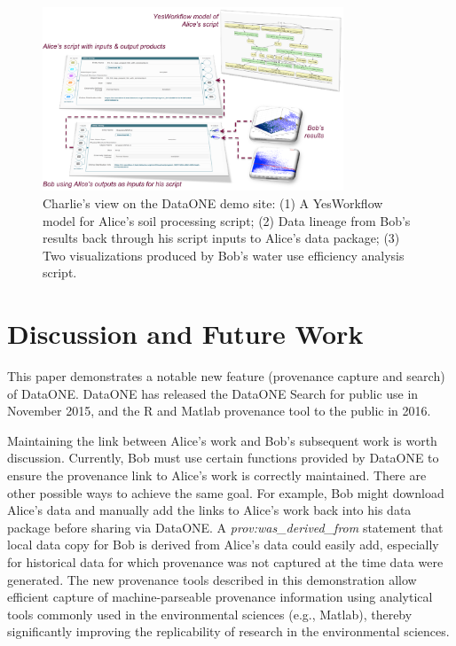 \documentclass[a4paper]{llncs}
\begin{document}
\begin{figure}[t]
\centering   
\includegraphics[width=0.8\textwidth]{figs/abc-crop}
\caption{Charlie's view on the DataONE demo site: (1) A YesWorkflow model for Alice's soil processing script; (2) Data lineage from Bob's results back through his script inputs to Alice's data package; (3) Two visualizations produced by Bob's water use efficiency analysis script.}
\label{fig2}
\end{figure}


\section{Discussion and Future Work}

This paper demonstrates a notable new feature (provenance capture and search) of DataONE. DataONE has released the DataONE Search for public use in November 2015, and the R and Matlab provenance tool to the public in 2016. 

Maintaining the link between Alice's work and Bob's subsequent work is worth discussion. Currently, Bob must use certain functions provided by DataONE to ensure the provenance link to Alice's work is correctly maintained. There are other possible ways to achieve the same goal. For example,  Bob might download Alice's data and manually add the links to Alice's work back into his data package before sharing via DataONE. A \emph{prov:was\_derived\_from} statement that local data copy for Bob is derived from Alice's data could easily add, especially for historical data for which provenance was not captured at the time data were generated.  The new provenance tools described in this demonstration allow efficient capture of machine-parseable provenance information using analytical tools commonly used in the environmental sciences (e.g., Matlab), thereby significantly improving the replicability of research in the environmental sciences.
\end{document}
